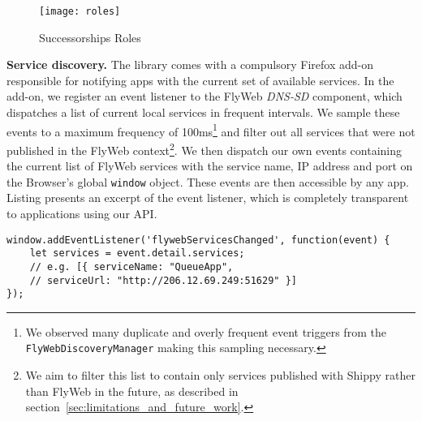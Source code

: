 \begin{figure}[h]
    \centering
    \texttt{[image: roles]}
    \caption{Successorships Roles}
    \label{fig:roles}
\end{figure}

\noindent\textbf{Service discovery.} 
The \APIshort library comes with a compulsory Firefox add-on responsible for notifying apps with the current set of available \APIshort services. 
In the add-on, we register an event listener to the FlyWeb \textit{DNS-SD} component, which dispatches a list of current local services in frequent intervals.
We sample these events to a maximum frequency of 100ms\footnote{We observed many duplicate and overly frequent event triggers from the \texttt{FlyWebDiscoveryManager} making this sampling necessary.} and filter out all services that were not published in the FlyWeb context\footnote{We aim to filter this list to contain only services published with Shippy rather than FlyWeb in the future, as described in section~\ref{sec:limitations_and_future_work}.}. 
We then dispatch our own events containing the current list of FlyWeb services with the service name, IP address and port on the Browser's global \texttt{window} object. 
These events are then accessible by any \APIshort app.
Listing presents an excerpt of the \APIshort event listener, which is completely transparent to applications using our API.


\begin{lstlisting}[caption={Event listener for service discovery},label={lst:service_discovery}]
window.addEventListener('flywebServicesChanged', function(event) {
    let services = event.detail.services;
    // e.g. [{ serviceName: "QueueApp",
    // serviceUrl: "http://206.12.69.249:51629" }]
});
\end{lstlisting}

